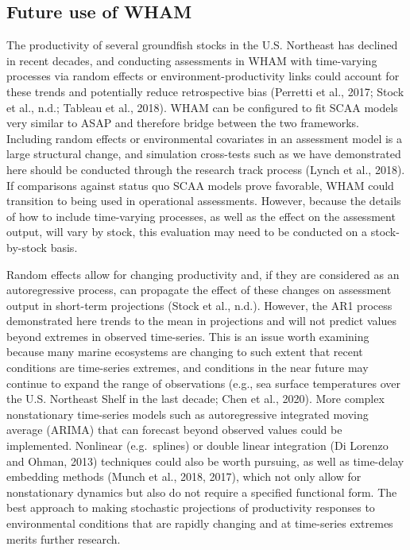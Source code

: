 \documentclass[]{article}
\begin{document}
\hypertarget{future-use-of-wham}{%
\subsection{Future use of WHAM}\label{future-use-of-wham}}

The productivity of several groundfish stocks in the U.S. Northeast has
declined in recent decades, and conducting assessments in WHAM with
time-varying processes via random effects or environment-productivity
links could account for these trends and potentially reduce
retrospective bias (Perretti et al., 2017; Stock et al., n.d.; Tableau
et al., 2018). WHAM can be configured to fit SCAA models very similar to
ASAP and therefore bridge between the two frameworks. Including random
effects or environmental covariates in an assessment model is a large
structural change, and simulation cross-tests such as we have
demonstrated here should be conducted through the research track process
(Lynch et al., 2018). If comparisons against status quo SCAA models
prove favorable, WHAM could transition to being used in operational
assessments. However, because the details of how to include time-varying
processes, as well as the effect on the assessment output, will vary by
stock, this evaluation may need to be conducted on a stock-by-stock
basis.

Random effects allow for changing productivity and, if they are
considered as an autoregressive process, can propagate the effect of
these changes on assessment output in short-term projections (Stock et
al., n.d.). However, the AR1 process demonstrated here trends to the
mean in projections and will not predict values beyond extremes in
observed time-series. This is an issue worth examining because many
marine ecosystems are changing to such extent that recent conditions are
time-series extremes, and conditions in the near future may continue to
expand the range of observations (e.g., sea surface temperatures over
the U.S. Northeast Shelf in the last decade; Chen et al., 2020). More
complex nonstationary time-series models such as autoregressive
integrated moving average (ARIMA) that can forecast beyond observed
values could be implemented. Nonlinear (e.g.~splines) or double linear
integration (Di Lorenzo and Ohman, 2013) techniques could also be worth
pursuing, as well as time-delay embedding methods (Munch et al., 2018,
2017), which not only allow for nonstationary dynamics but also do not
require a specified functional form. The best approach to making
stochastic projections of productivity responses to environmental
conditions that are rapidly changing and at time-series extremes merits
further research.
\end{document}
